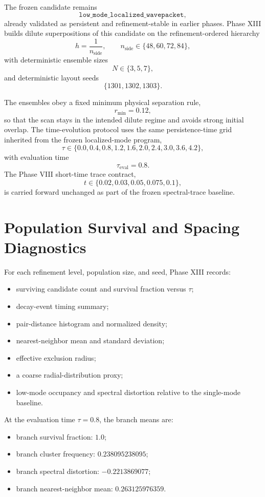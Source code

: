 \documentclass[11pt]{article}
\begin{document}
The frozen candidate remains
\[
\texttt{low\_mode\_localized\_wavepacket},
\]
already validated as persistent and refinement-stable in earlier phases. Phase XIII builds dilute superpositions of this candidate on the refinement-ordered hierarchy
\[
h = \frac{1}{n_{\mathrm{side}}},
\qquad
n_{\mathrm{side}} \in \{48,60,72,84\},
\]
with deterministic ensemble sizes
\[
N \in \{3,5,7\},
\]
and deterministic layout seeds
\[
\{1301,1302,1303\}.
\]

The ensembles obey a fixed minimum physical separation rule,
\[
r_{\min}=0.12,
\]
so that the scan stays in the intended dilute regime and avoids strong initial overlap. The time-evolution protocol uses the same persistence-time grid inherited from the frozen localized-mode program,
\[
\tau \in \{0.0,0.4,0.8,1.2,1.6,2.0,2.4,3.0,3.6,4.2\},
\]
with evaluation time
\[
\tau_{\mathrm{eval}} = 0.8.
\]
The Phase VIII short-time trace contract,
\[
t \in \{0.02,0.03,0.05,0.075,0.1\},
\]
is carried forward unchanged as part of the frozen spectral-trace baseline.

\section{Population Survival and Spacing Diagnostics}

For each refinement level, population size, and seed, Phase XIII records:
\begin{itemize}
\item surviving candidate count and survival fraction versus $\tau$;
\item decay-event timing summary;
\item pair-distance histogram and normalized density;
\item nearest-neighbor mean and standard deviation;
\item effective exclusion radius;
\item a coarse radial-distribution proxy;
\item low-mode occupancy and spectral distortion relative to the single-mode baseline.
\end{itemize}

At the evaluation time $\tau=0.8$, the branch means are:
\begin{itemize}
\item branch survival fraction: $1.0$;
\item branch cluster frequency: $0.238095238095$;
\item branch spectral distortion: $-0.2213869077$;
\item branch nearest-neighbor mean: $0.263125976359$.
\end{itemize}
\end{document}
